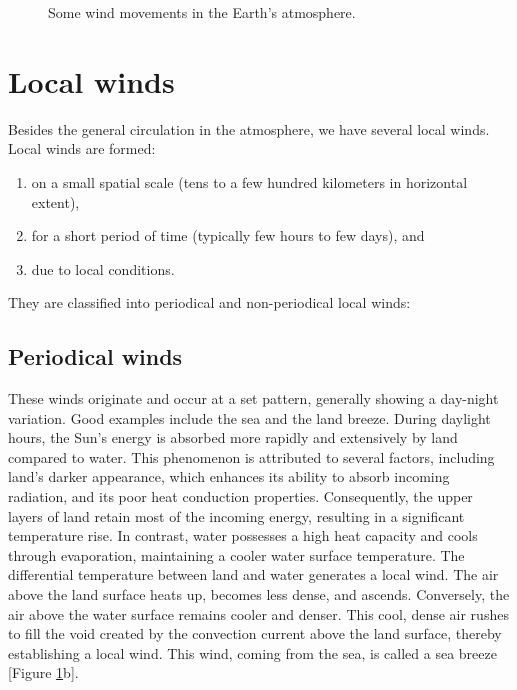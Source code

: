 \documentclass[
  12 pt,
]{Nemilov}
\begin{document}
\begin{figure}
{}

\caption{Some wind movements in the Earth’s atmosphere.}\label{fig:WindFigure}
\end{figure}

\section{Local winds}\label{local-winds}

Besides the general circulation in the atmosphere, we have several local winds. Local winds are formed:

\begin{enumerate}
\def\labelenumi{\arabic{enumi}.}
\item
  on a small spatial scale (tens to a few hundred kilometers in horizontal extent),
\item
  for a short period of time (typically few hours to few days), and
\item
  due to local conditions.
\end{enumerate}

They are classified into periodical and non-periodical local winds:

\subsection{Periodical winds}\label{periodical-winds}

These winds originate and occur at a set pattern, generally showing a day-night variation. Good examples include the sea and the land breeze. During daylight hours, the Sun's energy is absorbed more rapidly and extensively by land compared to water. This phenomenon is attributed to several factors, including land's darker appearance, which enhances its ability to absorb incoming radiation, and its poor heat conduction properties. Consequently, the upper layers of land retain most of the incoming energy, resulting in a significant temperature rise. In contrast, water possesses a high heat capacity and cools through evaporation, maintaining a cooler water surface temperature. The differential temperature between land and water generates a local wind. The air above the land surface heats up, becomes less dense, and ascends. Conversely, the air above the water surface remains cooler and denser. This cool, dense air rushes to fill the void created by the convection current above the land surface, thereby establishing a local wind. This wind, coming from the sea, is called a sea breeze {[}Figure \ref{fig:WindFigure}b{]}.
\end{document}
